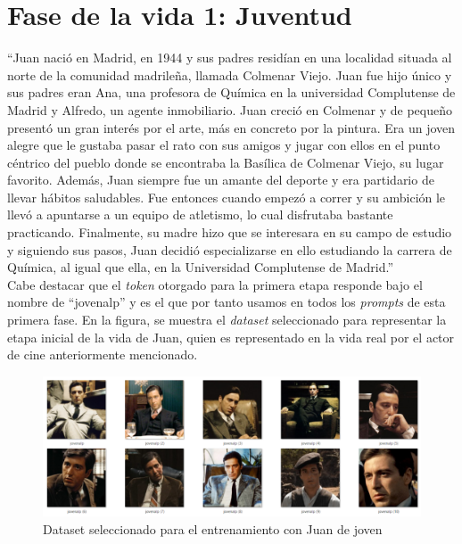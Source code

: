 \section{Fase de la vida 1: Juventud}

``Juan nació en Madrid, en 1944 y sus padres residían en una localidad situada al norte de la comunidad madrileña, llamada Colmenar Viejo. Juan fue hijo único y sus padres eran Ana, una profesora de Química en la universidad Complutense de Madrid y Alfredo, un agente inmobiliario. Juan creció en Colmenar y de pequeño presentó un gran interés por el arte, más en concreto por la pintura. Era un joven alegre que le gustaba pasar el rato con sus amigos y jugar con ellos en el punto céntrico del pueblo donde se encontraba la Basílica de Colmenar Viejo, su lugar favorito. Además, Juan siempre fue un amante del deporte y era partidario de llevar hábitos saludables. Fue entonces cuando empezó a correr y su ambición le llevó a apuntarse a un equipo de atletismo, lo cual disfrutaba bastante practicando. Finalmente, su madre hizo que se interesara en su campo de estudio y siguiendo sus pasos, Juan decidió especializarse en ello estudiando la carrera de Química, al igual que ella, en la Universidad Complutense de Madrid.'' \\

Cabe destacar que el \textit{token} otorgado para la primera etapa responde bajo el nombre de ``jovenalp'' y es el que por tanto usamos en todos los \textit{prompts} de esta primera fase. En la figura, se muestra el \textit{dataset} seleccionado para representar la etapa inicial de la vida de Juan, quien es representado en la vida real por el actor de cine anteriormente mencionado. \\

\begin{figure}[!htb]
	\centering
	\includegraphics[width = 1
	\textwidth]{Imagenes/Vectorial/dataset_jovenalp.png}
	\caption{Dataset seleccionado para el entrenamiento con Juan de joven}
	\label{fig:datasetjovenalp}
\end{figure}

